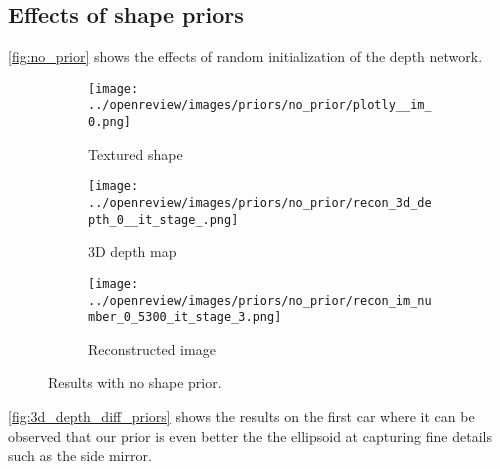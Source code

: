 \subsection{Effects of shape priors}
\label{app:priors}
\autoref{fig:no_prior} shows the effects of random initialization of the depth network.
\begin{figure}[!htb]
\centering
\begin{subfigure}{0.30\textwidth}
    \centering
    \texttt{[image: ../openreview/images/priors/no\_prior/plotly\_\_im\_0.png]}
    \caption{Textured shape}
    
\end{subfigure}
\begin{subfigure}{0.30\textwidth}
    \centering
    \texttt{[image: ../openreview/images/priors/no\_prior/recon\_3d\_depth\_0\_\_it\_stage\_.png]}
    \caption{3D depth map}
    
\end{subfigure}
\begin{subfigure}{0.30\textwidth}
    \centering
    \texttt{[image: ../openreview/images/priors/no\_prior/recon\_im\_number\_0\_5300\_it\_stage\_3.png]}
    \caption{Reconstructed image}
    
\end{subfigure}
    \caption{Results with no shape prior.}
    \label{fig:no_prior}
\end{figure}
\autoref{fig:3d_depth_diff_priors} shows the results on the first car where it can be observed that our prior is even better the the ellipsoid at capturing fine details such as the side mirror.
